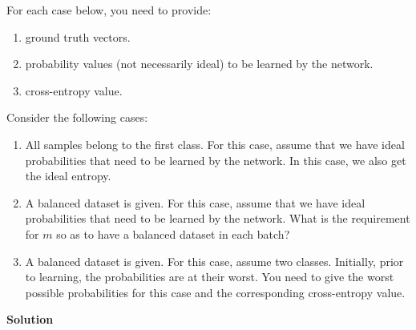\documentclass[12pt]{article}
\begin{document}
	For each case below, you need to provide:
	
	\begin{enumerate}
		\item ground truth vectors.
		
		\item probability values (not necessarily ideal) to be learned by the network.
		
		\item cross-entropy value.
	\end{enumerate}
	
	Consider the following cases:
	
	\begin{enumerate}
		\item[(i)] All samples belong to the first class. For this case, assume that we have ideal probabilities that need to be learned by the network. In this case, we also get the ideal entropy.
		
		\item[(ii)] A balanced dataset is given. For this case, assume that we have ideal probabilities that need to be learned by the network. What is the requirement for $m$ so as to have a balanced dataset in each batch?
		
		\item[(iii)] A balanced dataset is given. For this case, assume two classes. Initially, prior to learning, the probabilities are at their worst. You need to give the worst possible probabilities for this case and the corresponding cross-entropy value.
	\end{enumerate}
	
	\textbf{Solution}
	
\end{document}
